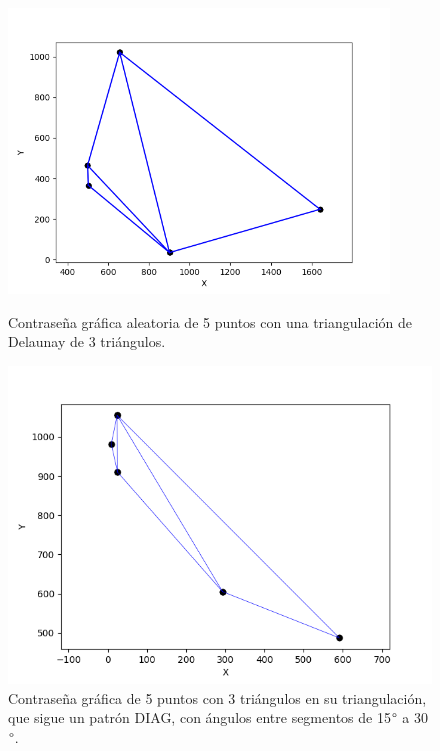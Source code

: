 \documentclass[12pt]{report}
\begin{document}
	\begin{figure}[h]
	\centering
	\begin{minipage}[t]{0.45\textwidth}
		\centering
	\includegraphics[width=0.9\textwidth]{alea3td.png}
	\caption{Contraseña gráfica aleatoria de 5 puntos con una triangulación de Delaunay de 3 triángulos.}
	\label{3TD}
		
	\end{minipage}\hfill
	\begin{minipage}[t]{0.45\textwidth}
		\centering
		\includegraphics[width=0.9\linewidth]{3td30.png}  %
		\caption{Contraseña gráfica de 5 puntos con 3 triángulos en su triangulación, que sigue un patrón DIAG, con ángulos entre segmentos de 15$\degree$ a 30$\degree$.}
		\label{3td30}
	\end{minipage}
\end{figure}
\end{document}
